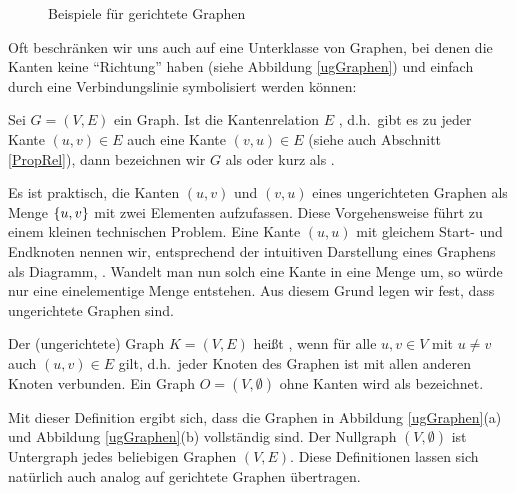 \begin{figure}[h]
\centering
{}
\hspace*{2em}
\hspace*{2em}
\caption{Beispiele für gerichtete Graphen}
\label{gGraphen}
\end{figure}
Oft beschränken wir uns auch auf eine Unterklasse von Graphen, bei
denen die Kanten keine "`Richtung"' haben (siehe
Abbildung \ref{ugGraphen}) und einfach durch eine Verbindungslinie
symbolisiert werden können:

\begin{definition}
Sei $G=(V,E)$ ein Graph. Ist die Kantenrelation
$E$ , d.h.~gibt es zu jeder Kante $(u,v) \in E$
auch eine Kante $(v,u) \in E$ (siehe auch Abschnitt \ref{PropRel}),
dann bezeichnen wir $G$ als  oder kurz als .
\end{definition}

Es ist praktisch, die Kanten $(u,v)$ und $(v,u)$ eines ungerichteten
Graphen als Menge $\{u,v\}$ mit zwei Elementen aufzufassen. Diese
Vorgehensweise führt zu einem kleinen technischen Problem. Eine Kante
$(u,u)$ mit gleichem Start- und Endknoten nennen wir, entsprechend der
intuitiven Darstellung eines Graphens als Diagramm, .
Wandelt man nun solch eine Kante in eine Menge um, so würde nur eine
einelementige Menge entstehen. Aus diesem Grund legen wir fest, dass
ungerichtete Graphen  sind.

\begin{definition}
Der (ungerichtete) Graph $K = (V,E)$ heißt , wenn
für alle $u,v \in V$ mit $u \neq v$ auch $(u,v) \in E$ gilt,
d.h.~jeder Knoten des Graphen ist mit allen anderen Knoten
verbunden. Ein Graph $O=(V,\emptyset)$ ohne Kanten wird
als  bezeichnet.
\end{definition}
Mit dieser Definition ergibt sich, dass die Graphen in
Abbildung \ref{ugGraphen}(a) und Abbildung \ref{ugGraphen}(b)
vollständig sind. Der Nullgraph $(V,\emptyset)$ ist Untergraph jedes
beliebigen Graphen $(V,E)$. Diese Definitionen lassen sich natürlich
auch analog auf gerichtete Graphen übertragen.

